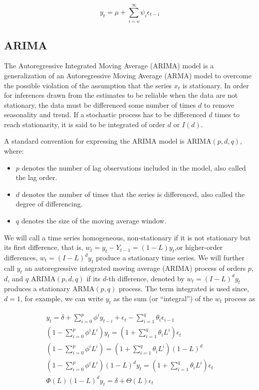 \documentclass[
  11pt,
]{article}
\begin{document}
\[
y_{t} = \mu + \sum\limits_{i= o}^{\infty}\psi_{i}\epsilon_{t-i}
\]

\hypertarget{arima}{%
\subsection{ARIMA}\label{arima}}

The Autoregressive Integrated Moving Average (ARIMA) model is a
generalization of an Autoregressive Moving Average (ARMA) model to
overcome the possible violation of the assumption that the series
\(x_{t}\) is stationary. In order for inferences drawn from the
estimates to be reliable when the data are not stationary, the data must
be differenced some number of times \(d\) to remove seasonality and
trend. If a stochastic process has to be differenced \(d\) times to
reach stationarity, it is said to be integrated of order \(d\) or
\(I(d)\).

A standard convention for expressing the ARIMA model is
\(\mathrm{ARIMA}(p, d, q)\), where:

\begin{itemize}
\item
  \(p\) denotes the number of lag observations included in the model,
  also called the lag order.
\item
  \(d\) denotes the number of times that the series is differenced, also
  called the degree of differencing.
\item
  \(q\) denotes the size of the moving average window.
\end{itemize}

We will call a time series homogeneous, non-stationary if it is not
stationary but its first difference, that is,
\(w_{t} = y_{t} - Y_{t-1} =(1 - L)y_{t}\),or higher-order differences,
\(w_{t} =(I- L)^{d}y_{t}\) produce a stationary time series. We will
further call \(y_{t}\) an autoregressive integrated moving average
(\(\mathrm{ARIMA}\)) process of orders \(p\), \(d\), and \(q\)
\(\mathrm{ARIMA}(p, d, q)\) if its \(d\)-th difference, denoted by
\(w_{t} =(I- L)^{d}y_{t}\) produces a stationary \(\mathrm{ARMA}(p, q)\)
process. The term integrated is used since, \(d = 1\), for example, we
can write \(y_{t}\) as the sum (or ``integral'') of the \(w_{t}\)
process as

\begin{gather*}
y_{t} = \delta + \sum\limits_{i=0}^{p}\phi^{i}y_{t- i} + \epsilon_{t} - \sum\limits_{i=1}^{q}\theta_{i}\epsilon_{i-1} \\[8pt]
\left(1 - \sum\limits_{i=0}^{p}\phi^{i}L^{i}\right)y_{t} = \left(1 + \sum\limits_{i=1}^{q}\theta_{i}L^{i}\right)\epsilon_{t} \\[8pt]
\left(1 - \sum\limits_{i=0}^{p}\phi^{i}L^{i}\right) = \left(1 + \sum\limits_{i=1}^{q}\theta_{i}L^{i}\right)\left(1 - L\right)^{d} \\[8pt]
\left(1 - \sum\limits_{i=0}^{p}\phi^{i}L^{i}\right)\left(1 - L\right)^{d}y_{t} = \left(1 + \sum\limits_{i=1}^{q}\theta_{i}L^{i}\right)\epsilon_{t} \\[8pt]
\Phi(L)(1 - L)^{d}y_{t} = \delta + \Theta(L)\epsilon_{t}
\end{gather*}
\end{document}
